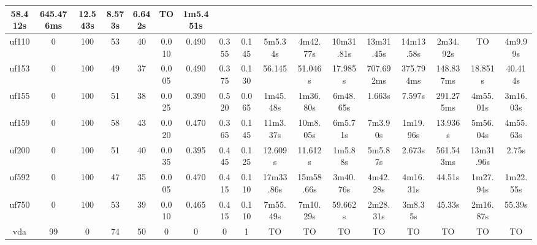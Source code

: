 \documentclass{article}
\begin{document}
\begin{table}[ht!]
\begin{tabular}{|c||c|c|c|c|c|c|c|c||c|c|c|c|c|c|c|c|}
58.412s & 645.476ms & 12.543s & 8.573s & 6.642s & TO & 1m5.451s \\\hline
uf110 & 0 & 100 & 53 & 40 & 0.010 & 0.490 & 0.355 & 0.145 & 5m5.34s &
4m42.77s & 10m31.81s & 13m31.45s & 14m13.58s & 2m34.92s & TO & 4m9.99s \\\hline
uf153 & 0 & 100 & 49 & 37 & 0.005 & 0.490 & 0.375 & 0.130 & 56.145 & 51.046s & 17.985s & 707.692ms & 375.794ms & 148.837ms & 18.851s & 40.414s \\\hline
uf155 & 0 & 100 & 51 & 38 & 0.025 & 0.390 & 0.520 & 0.065 & 1m45.48s & 1m36.80s & 6m48.65s & 1.663s & 7.597s & 291.275ms & 4m55.01s & 3m16.03s \\\hline
uf159 & 0 & 100 & 58 & 43 & 0.020 & 0.470 & 0.365 & 0.145 & 11m3.37s & 10m8.05s & 6m5.71s & 7m3.90s & 1m19.96s & 13.936s & 5m56.04s & 4m55.63s \\\hline
uf200 & 0 & 100 & 51 & 40 & 0.035 & 0.395 & 0.445 & 0.125 & 12.609s & 11.612s & 1m5.88s & 5m5.87s & 2.673s & 561.543ms & 13m31.96s & 2.75s \\\hline
uf592 & 0 & 100 & 47 & 35 & 0.005 & 0.470 & 0.415 & 0.110 & 17m33.86s & 15m58.66s & 3m40.76s & 4m42.28s & 4m16.31s & 44.51s & 1m27.94s & 1m22.55s \\\hline
uf750 & 0 & 100 & 53 & 39 & 0.010 & 0.465 & 0.415 & 0.110 & 7m55.49s & 7m10.29s & 59.662s & 2m28.31s & 3m8.35s & 45.33s & 2m16.87s & 55.39s \\\hline
vda & 99 & 0 & 74 & 50 & 0 & 0 & 0 & 1& TO & TO & TO & TO & TO & TO & TO & TO  \\\hline
\end{tabular}
\end{table}
\end{document}
